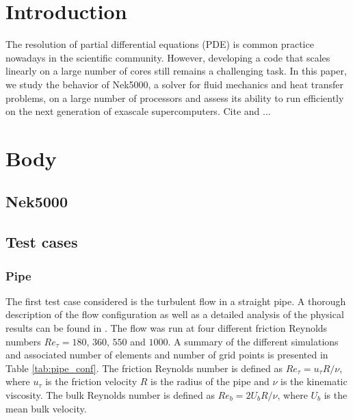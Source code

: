 \documentclass{sig-alternate}
\begin{document}
\section{Introduction}

The resolution of partial differential equations (PDE) is common practice nowadays in the scientific community. However, developing a code that scales linearly on a large number of cores still remains a challenging task. In this paper, we study the behavior of Nek5000, a solver for fluid mechanics and heat transfer problems, on a large number of processors and assess its ability to run efficiently on the next generation of exascale supercomputers. Cite\cite{fischer:scaling} and \cite{tufo:terascale}...

\section{Body}

\subsection{Nek5000}


\subsection{Test cases}

\subsubsection{Pipe}

The first test case considered is the turbulent flow in a straight pipe. A thorough description of the flow configuration as well as a detailed analysis of the physical results can be found in \cite{Khoury2013}. The flow was run at four different friction Reynolds numbers $Re_{\tau} = 180$, $360$, $550$ and $1000$. A summary of the different simulations and associated number of elements and number of grid points is presented in Table \ref{tab:pipe_conf}. The friction Reynolds number is defined as $Re_{\tau} = u_{\tau} R / \nu$, where $u_{\tau}$ is the friction velocity $R$ is the radius of the pipe and  $\nu$ is the kinematic viscosity. The bulk Reynolds number is defined as $Re_{b} = 2 U_b R / \nu$, where $U_b$ is the mean bulk velocity. 
\end{document}
